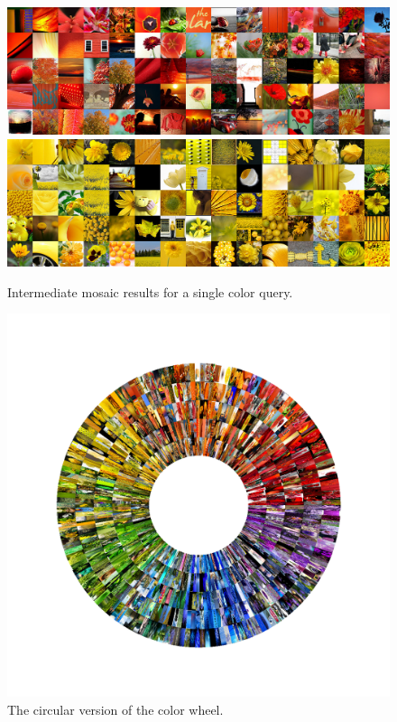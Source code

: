 \documentclass[letterpaper,12pt]{article}
\begin{document}
\begin{figure}
	\centering
	\includegraphics[scale=0.15]{../Output/red,orangeAggregate.png}
	\includegraphics[scale=0.15]{../Output/yellowAggregate.png}
	\caption{Intermediate mosaic results for a single color query.}
\end{figure}
\begin{figure}
	\centering
	\includegraphics[scale=0.2]{../Output/colorWheel-2.png}
	\caption{The circular version of the color wheel.}
\end{figure}
\end{document}
